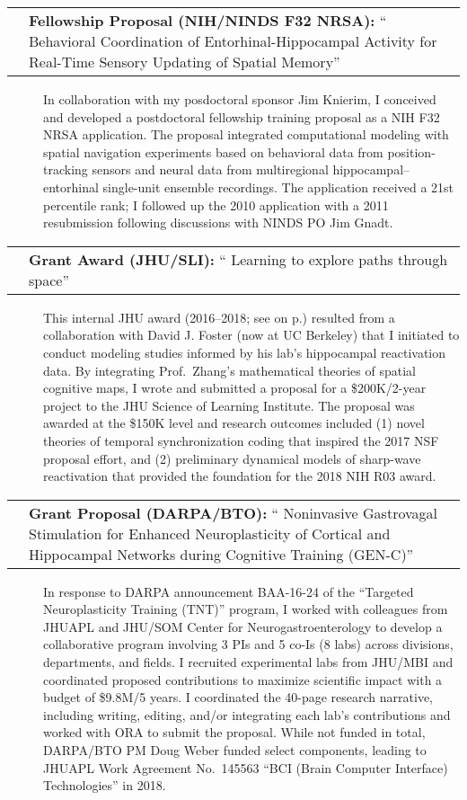\documentclass[10pt]{article}
\makeatletter
\newcommand{\unpubtitle}[1]{{\color{hopkinsblue} #1}}
\newcommand{\researchnote}[1]{
  \begin{description}
    \item[] {\hspace{2.2ex}\color{darkgray} #1}
  \end{description}
}
\newcommand{\researchactivity}[4]{
  \begin{minipage}[t]{\textwidth}
    \begin{tabular}{@{\hspace{2ex}}l>{\raggedright\arraybackslash}p{.8\textwidth}}
      \makebox[1.2in][l]{#1} & \textbf{#2:}
      ``\unpubtitle{#3}'' 
    \end{tabular}
  \researchnote{\hspace{1ex} #4}
  \end{minipage}
  \medbreak
}
\makeatother
\begin{document}
\researchactivity
{April 2010/2011}
{Fellowship Proposal (NIH/NINDS F32 NRSA)}
{Behavioral Coordination of Entorhinal-Hippocampal Activity for Real-Time
Sensory Updating of Spatial Memory}
{In collaboration with my posdoctoral sponsor Jim Knierim, I conceived and
  developed a postdoctoral fellowship training proposal as a NIH F32 NRSA
  application. The proposal integrated computational modeling with spatial
  navigation experiments based on behavioral data from position-tracking sensors
  and neural data from multiregional hippocampal--entorhinal single-unit ensemble
  recordings. The application received a 21st percentile rank; I followed up the
  2010 application with a 2011 resubmission following discussions with NINDS PO
Jim Gnadt.}
\label{sec:nrsa}

\researchactivity
{Mar. 2016--2018}
{Grant Award (JHU/SLI)}
{Learning to explore paths through space}
{This internal JHU award (2016--2018; see
  \emph{\nameref{sec:previnternalsupport}} on p.\pageref{sec:previnternalsupport})
  resulted from a collaboration with David J. Foster (now at UC Berkeley) that
  I initiated to conduct modeling studies informed by his lab’s hippocampal
  reactivation data. By integrating Prof.~Zhang’s mathematical theories of
  spatial cognitive maps, I wrote and submitted a proposal for a \$200K/2-year
  project to the JHU Science of Learning Institute. The proposal was awarded at
  the \$150K level and research outcomes included (1) novel theories of temporal
  synchronization coding that inspired the 2017 NSF proposal effort, and (2)
  preliminary dynamical models of sharp-wave reactivation that provided the
foundation for the 2018 NIH R03 award.}
\label{sec:sli}

\researchactivity
{April--June 2016}
{Grant Proposal (DARPA/BTO)}
{Noninvasive Gastrovagal Stimulation for Enhanced Neuroplasticity of Cortical
and Hippocampal Networks during Cognitive Training (GEN-C)}
{In response to DARPA announcement BAA-16-24 of the “Targeted Neuroplasticity
  Training (TNT)” program, I worked with colleagues from JHUAPL and JHU/SOM
  Center for Neurogastroenterology to develop a collaborative program involving 3
  PIs and 5 co-Is (8 labs) across divisions, departments, and fields. I recruited
  experimental labs from JHU/MBI and coordinated proposed contributions to
  maximize scientific impact with a budget of \$9.8M/5 years. I coordinated the
  40-page research narrative, including writing, editing, and/or integrating
  each lab’s contributions and worked with ORA to submit the proposal. While
  not funded in total, DARPA/BTO PM Doug Weber funded select components, leading
  to JHUAPL Work Agreement No.~145563 “BCI (Brain Computer Interface)
Technologies” in 2018.}
\label{sec:genc}
\end{document}
